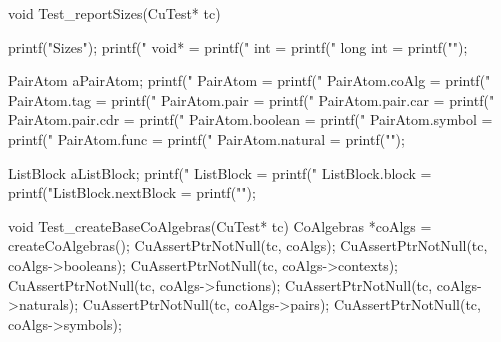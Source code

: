 void Test_reportSizes(CuTest* tc) {
  printf("\nStructure Sizes\n");
  printf("              void* = %
  printf("                int = %
  printf("           long int = %
  printf("\n");

  PairAtom aPairAtom;
  printf("           PairAtom = %
  printf("     PairAtom.coAlg = %
  printf("       PairAtom.tag = %
  printf("      PairAtom.pair = %
  printf("  PairAtom.pair.car = %
  printf("  PairAtom.pair.cdr = %
  printf("   PairAtom.boolean = %
  printf("    PairAtom.symbol = %
  printf("      PairAtom.func = %
  printf("   PairAtom.natural = %
  printf("\n");

  ListBlock aListBlock;
  printf("          ListBlock = %
  printf("    ListBlock.block = %
  printf("ListBlock.nextBlock = %
  printf("\n");
}

void Test_createBaseCoAlgebras(CuTest* tc) {
  CoAlgebras *coAlgs = createCoAlgebras();
  CuAssertPtrNotNull(tc, coAlgs);
  CuAssertPtrNotNull(tc, coAlgs->booleans);
  CuAssertPtrNotNull(tc, coAlgs->contexts);
  CuAssertPtrNotNull(tc, coAlgs->functions);
  CuAssertPtrNotNull(tc, coAlgs->naturals);
  CuAssertPtrNotNull(tc, coAlgs->pairs);
  CuAssertPtrNotNull(tc, coAlgs->symbols);
}
\stoptyping




